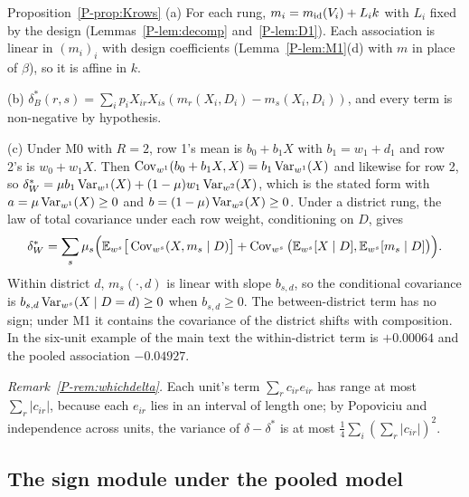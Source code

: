 \begin{proofof}{Proposition~\ref{P-prop:Krows}}
(a) For each rung, $m_i=m_{\rm id}(V_i)+L_ik$ with $L_i$ fixed by the design
(Lemmas~\ref{P-lem:decomp} and~\ref{P-lem:D1}). Each association is linear in
$(m_i)_i$ with design coefficients (Lemma~\ref{P-lem:M1}(d) with $m$ in place of
$\beta$), so it is affine in $k$.

(b) $\delta^*_B(r,s)=\sum_ip_iX_{ir}X_{is}(m_r(X_i,D_i)-m_s(X_i,D_i))$, and every term is
non-negative by hypothesis.

(c) Under M0 with $R=2$, row 1's mean is $b_0+b_1X$ with $b_1=w_1+d_1$ and row 2's is
$w_0+w_1X$. Then $\operatorname{Cov}_{w^1}(b_0+b_1X,X)=b_1\operatorname{Var}_{w^1}(X)$ and likewise for row 2, so
$\delta^*_W=\mu b_1\operatorname{Var}_{w^1}(X)+(1-\mu)w_1\operatorname{Var}_{w^2}(X)$, which is the stated form with
$a=\mu\operatorname{Var}_{w^1}(X)\ge0$ and $b=(1-\mu)\operatorname{Var}_{w^2}(X)\ge0$. Under a district rung, the law
of total covariance under each row weight, conditioning on $D$, gives
\[
\delta^*_W=\sum_s\mu_s\Big(\mathbb E_{w^s}\big[\operatorname{Cov}_{w^s}(X,m_s\mid D)\big]+\operatorname{Cov}_{w^s}\big(\mathbb E_{w^s}[X\mid D],\mathbb E_{w^s}[m_s\mid D]\big)\Big).
\]
Within district $d$, $m_s(\cdot,d)$ is linear with slope $b_{s,d}$, so the conditional
covariance is $b_{s,d}\operatorname{Var}_{w^s}(X\mid D=d)\ge0$ when $b_{s,d}\ge0$. The between-district
term has no sign; under M1 it contains the covariance of the district shifts with
composition. In the six-unit example of the main text the within-district term is
$+0.00064$ and the pooled association $-0.04927$.
\end{proofof}

\emph{Remark~\ref{P-rem:whichdelta}.} Each unit's term
$\sum_rc_{ir}e_{ir}$ has range at most $\sum_r|c_{ir}|$, because each $e_{ir}$ lies in an
interval of length one; by Popoviciu and independence across units, the variance of
$\delta-\delta^*$ is at most $\tfrac14\sum_i(\sum_r|c_{ir}|)^2$.

\subsection{The sign module under the pooled model}

